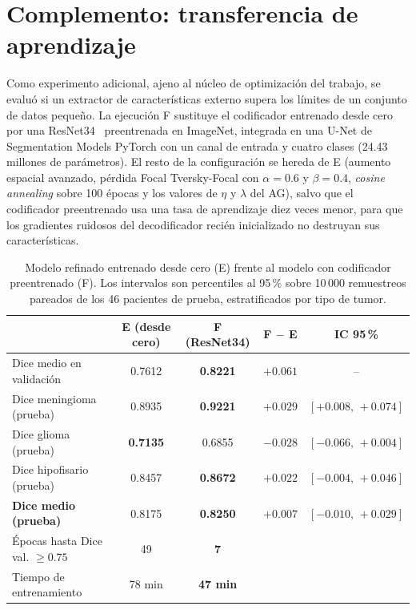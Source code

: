 \section{Complemento: transferencia de aprendizaje}\label{sec:transferencia}

Como experimento adicional, ajeno al núcleo de optimización del trabajo, se evaluó si un extractor de características externo supera los límites de un conjunto de datos pequeño. La ejecución F sustituye el codificador entrenado desde cero por una ResNet34~\cite{he2016resnet} preentrenada en ImageNet, integrada en una U-Net de Segmentation Models PyTorch con un canal de entrada y cuatro clases (24.43 millones de parámetros). El resto de la configuración se hereda de E (aumento espacial avanzado, pérdida Focal Tversky-Focal con $\alpha=0.6$ y $\beta=0.4$, \textit{cosine annealing} sobre 100 épocas y los valores de $\eta$ y $\lambda$ del AG), salvo que el codificador preentrenado usa una tasa de aprendizaje diez veces menor, para que los gradientes ruidosos del decodificador recién inicializado no destruyan sus características.

\begin{table}[htbp]
  \centering
  \caption{Modelo refinado entrenado desde cero (E) frente al modelo con codificador preentrenado (F). Los intervalos son percentiles al 95\,\% sobre 10\,000 remuestreos pareados de los 46 pacientes de prueba, estratificados por tipo de tumor.}
  \label{tab:transferencia}
  \small
  \begin{tabular}{lcccc}
    \toprule
    & \textbf{E (desde cero)} & \textbf{F (ResNet34)} & \textbf{F $-$ E} & \textbf{IC 95\,\%} \\
    \midrule
    Dice medio en validación  & 0.7612 & \textbf{0.8221} & $+0.061$ & -- \\
    \midrule
    Dice meningioma (prueba)  & 0.8935 & \textbf{0.9221} & $+0.029$ & $[+0.008,\,+0.074]$ \\
    Dice glioma (prueba)      & \textbf{0.7135} & 0.6855 & $-0.028$ & $[-0.066,\,+0.004]$ \\
    Dice hipofisario (prueba) & 0.8457 & \textbf{0.8672} & $+0.022$ & $[-0.004,\,+0.046]$ \\
    \textbf{Dice medio (prueba)} & 0.8175 & \textbf{0.8250} & $+0.007$ & $[-0.010,\,+0.029]$ \\
    \midrule
    Épocas hasta Dice val. $\geq0.75$ & 49 & \textbf{7} & & \\
    Tiempo de entrenamiento & 78 min & \textbf{47 min} & & \\
    \bottomrule
  \end{tabular}
\end{table}

